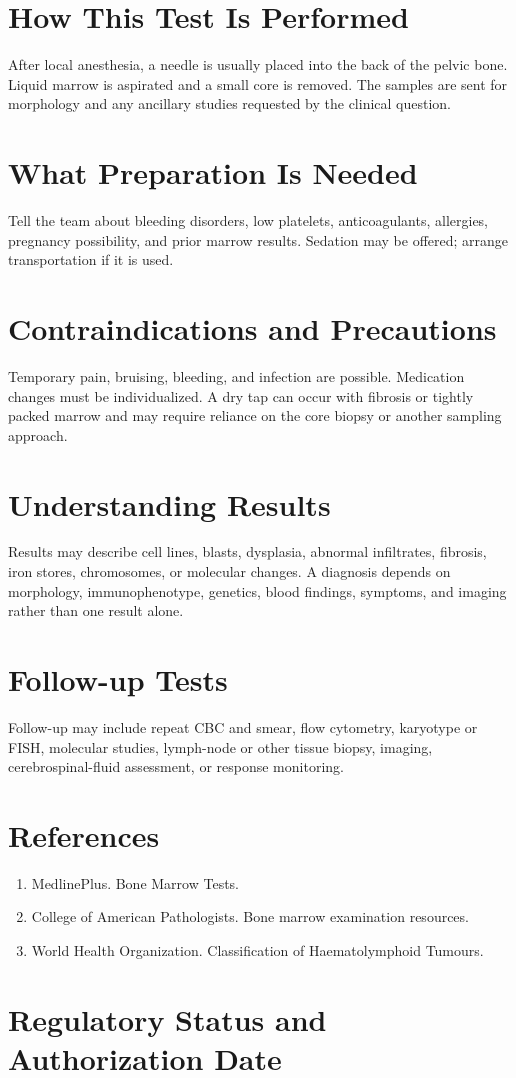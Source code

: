 \section*{How This Test Is Performed}
After local anesthesia, a needle is usually placed into the back of the pelvic bone. Liquid marrow is aspirated and a small core is removed. The samples are sent for morphology and any ancillary studies requested by the clinical question.

\section*{What Preparation Is Needed}
Tell the team about bleeding disorders, low platelets, anticoagulants, allergies, pregnancy possibility, and prior marrow results. Sedation may be offered; arrange transportation if it is used.

\section*{Contraindications and Precautions}
Temporary pain, bruising, bleeding, and infection are possible. Medication changes must be individualized. A dry tap can occur with fibrosis or tightly packed marrow and may require reliance on the core biopsy or another sampling approach.

\section*{Understanding Results}
Results may describe cell lines, blasts, dysplasia, abnormal infiltrates, fibrosis, iron stores, chromosomes, or molecular changes. A diagnosis depends on morphology, immunophenotype, genetics, blood findings, symptoms, and imaging rather than one result alone.

\section*{Follow-up Tests}
Follow-up may include repeat CBC and smear, flow cytometry, karyotype or FISH, molecular studies, lymph-node or other tissue biopsy, imaging, cerebrospinal-fluid assessment, or response monitoring.

\section*{References}
\begin{enumerate}
  \item MedlinePlus. Bone Marrow Tests.
  \item College of American Pathologists. Bone marrow examination resources.
  \item World Health Organization. Classification of Haematolymphoid Tumours.
\end{enumerate}

\clearpage


\section*{Regulatory Status and Authorization Date}

\clearpage
